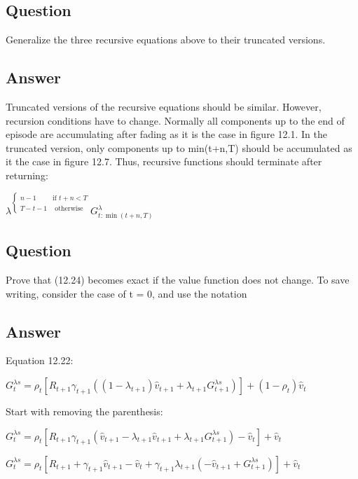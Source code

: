 \documentclass[11pt]{article}
\begin{document}
    \subsection{Question}

    Generalize the three recursive equations above to their truncated versions.

    \subsection*{Answer}

    Truncated versions of the recursive equations should be similar.
    However, recursion conditions have to change.
    Normally all components up to the end of episode are accumulating after fading as it is the case in figure 12.1.
    In the truncated version, only components up to min(t+n,T) should be accumulated as it the case in figure 12.7.
    Thus, recursive functions should terminate after returning:

        $ \lambda^{\begin{cases}%
  n-1       &   \text{if $t+n<T$}\\
  T-t-1     &   \text{ otherwise}
 \end{cases}} G_{t:\min(t+n,T)}^{\lambda} $

    \subsection{Question}

    Prove that (12.24) becomes exact if the value function does not change.
    To save writing, consider the case of t = 0, and use the notation

    \subsection*{Answer}

    \noindent Equation 12.22:

    \noindent $ G_{t}^{\lambda s} = \rho_{t} [ R_{t+1} \gamma_{t+1} ( (1-\lambda_{t+1}) \hat{v}_{t+1} +\lambda_{t+1}G_{t+1}^{\lambda s}) ] + (1-\rho_{t})\hat{v}_{t} $

    \hfill \break
    \noindent Start with removing the parenthesis:

    \noindent $ G_{t}^{\lambda s} = \rho_{t} [ R_{t+1} \gamma_{t+1} ( \hat{v}_{t+1} - \lambda_{t+1} \hat{v}_{t+1} + \lambda_{t+1}G_{t+1}^{\lambda s}) - \hat{v}_{t} ] + \hat{v}_{t} $

    \noindent $ G_{t}^{\lambda s} = \rho_{t} [ R_{t+1} + \gamma_{t+1} \hat{v}_{t+1} - \hat{v}_{t} + \gamma_{t+1} \lambda_{t+1} ( - \hat{v}_{t+1} + G_{t+1}^{\lambda s})  ] + \hat{v}_{t} $
\end{document}
